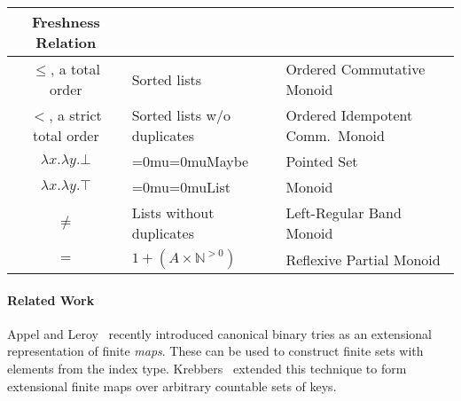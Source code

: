 \documentclass[a4paper]{easychair}
\newcommand{\AgdaFontStyle}[1]{\textsf{#1}}
\newcommand{\AgdaFormat}[2]{#2}
\newcommand{\AgdaNoSpaceMath}[1]
    {\begingroup\thickmuskip=0mu\medmuskip=0mu#1\endgroup}
\newcommand{\AgdaDatatype}[1]
    {\AgdaNoSpaceMath{\textcolor{AgdaDatatype}{\AgdaFontStyle{\AgdaFormat{#1}{{#1}}}}}}
\begin{document}
\begin{center}
\begin{tabular}{  |c|m{12em}|m{16em}| }
  \hline
  Freshness Relation & \centering{Data Structure} & \centering{Free Algebraic Structure} \tabularnewline
  \hline
  $\leq$, a total order & Sorted lists & Ordered Commutative Monoid \\
  $<$, a strict total order & Sorted lists w/o duplicates & Ordered Idempotent Comm.\ Monoid \\
  $\lambda x. \lambda y. \bot$ & \AgdaDatatype{Maybe} & Pointed Set \\
  $\lambda x. \lambda y. \top$ & \AgdaDatatype{List} & Monoid \\
  $\neq$ & Lists without duplicates & Left-Regular Band Monoid \\
  $=$ & $1 + (A \times \mathbb{N}^{>0})$ & Reflexive Partial Monoid \\
  \hline
\end{tabular}
\end{center}

\paragraph{Related Work}
Appel and Leroy~\cite{appelleroy2023tries} recently introduced canonical binary tries as an extensional representation of finite \emph{maps}.
These can be used to construct finite sets with elements from the index type.
Krebbers~\cite{krebbers2023extensionalmaps} extended this technique to form extensional finite maps over arbitrary countable sets of keys.





%
%
%


\end{document}
